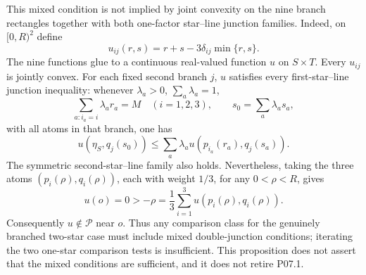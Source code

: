 \begin{proposition}
This mixed condition is not implied by joint convexity on the nine branch
rectangles together with both one-factor star--line junction families.
Indeed, on $[0,R)^2$ define
\begin{equation}
 u_{ij}(r,s)=r+s-3\delta_{ij}\min\{r,s\}.
 \label{eq:p071-trivalent-obstruction-function}
\end{equation}
The nine functions glue to a continuous real-valued function $u$ on
$S\times T$.  Every $u_{ij}$ is jointly convex.  For each fixed second
branch $j$, $u$ satisfies every first-star--line junction inequality:
whenever $\lambda_a>0$, $\sum_a\lambda_a=1$,
\begin{equation}
 \sum_{a:i_a=i}\lambda_ar_a=M\quad(i=1,2,3),
 \qquad s_0=\sum_a\lambda_as_a,
 \label{eq:p071-trivalent-first-separate-data}
\end{equation}
with all atoms in that branch, one has
\begin{equation}
 u(\eta_S,q_j(s_0))
       \leq\sum_a\lambda_a
             u(p_{i_a}(r_a),q_j(s_a)).
 \label{eq:p071-trivalent-first-separate-jensen}
\end{equation}
The symmetric second-star--line family also holds.  Nevertheless, taking
the three atoms $(p_i(\rho),q_i(\rho))$, each with weight $1/3$, for any
$0<\rho<R$, gives
\begin{equation}
 u(o)=0> -\rho
   =\frac13\sum_{i=1}^3u(p_i(\rho),q_i(\rho)).
 \label{eq:p071-trivalent-obstruction-violation}
\end{equation}
Consequently $u\notin\mathcal P$ near $o$.  Thus any comparison class for
the genuinely branched two-star case must include mixed double-junction
conditions; iterating the two one-star comparison tests is insufficient.
This proposition does not assert that the mixed conditions are sufficient,
and it does not retire P07.1.
\end{proposition}
